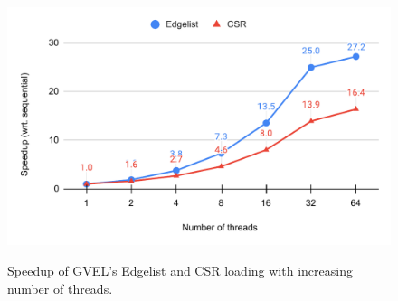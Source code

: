 \begin{figure}[hbtp]
  \centering
  \includegraphics[width=0.98\linewidth]{out/strong-scaling-runtime.pdf} \\[-2ex]
  \caption{Speedup of GVEL's Edgelist and CSR loading with increasing number of threads.}
  \label{fig:strong-scaling}
\end{figure}
